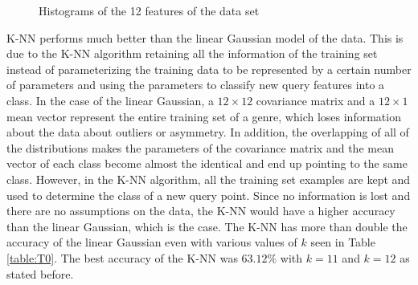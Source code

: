 \documentclass[11pt]{scrartcl}
\begin{document}
\begin{figure}[ht]
\caption{Histograms of the 12 features of the data set}
\label{fig:F14}
\end{figure}

K-NN performs much better than the linear Gaussian model of the data. This is due to the K-NN algorithm retaining all the information of the training set instead of parameterizing the training data to be represented by a certain number of parameters and using the parameters to  classify new query features into a class. In the case of the linear Gaussian, a $12\times 12$ covariance matrix and a $12\times 1$ mean vector represent the entire training set of a genre, which loses information about the data about outliers or asymmetry. In addition, the overlapping of all of the distributions makes the parameters of the covariance matrix and the mean vector of each class become almost the identical and end up pointing to the same class. However, in the K-NN algorithm, all the training set examples are kept and used to determine the class of a new query point. Since no information is lost and there are no assumptions on the data, the K-NN would have a higher accuracy than the linear Gaussian, which is the case. The K-NN has more than double the accuracy of the linear Gaussian even with various values of $k$ seen in Table \ref{table:T0}. The best accuracy of the K-NN was $63.12\%$ with $k=11$ and $k=12$ as stated before. 
\end{document}
